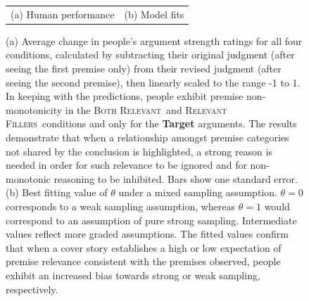 \documentclass[doc,12pt]{apa}
\newcommand{\relevant}{\textsc{Both Relevant}}
\newcommand{\relevantdata}{\textsc{Relevant Fillers}}
\begin{document}
\begin{figure}[htbp]
\begin{center}
\begin{tabular}{cc}
\multicolumn{1}{c}{\small (a) Human performance} &
\multicolumn{1}{c}{\small (b) Model fits}
\end{tabular}
\end{center}
\vspace{-5mm}
\caption{%
   (a) Average change in people's argument strength ratings for all four conditions, calculated by subtracting their original judgment (after seeing the first premise only) from their revised judgment (after seeing the second premise), then linearly scaled to the range -1 to 1.
%
In keeping with the predictions, people exhibit premise non-monotonicity in the \relevant\ and \relevantdata\ conditions and only for the {\bf Target} arguments. The results demonstrate that when a relationship amongst premise categories not shared by the conclusion is highlighted, a strong reason is needed in order for such relevance to be ignored and for non-monotonic reasoning to be inhibited. Bars show one standard error.\ %
%
  (b) Best fitting value of $\theta$ under a mixed sampling assumption. $\theta=0$ corresponds to a weak sampling assumption, whereas $\theta=1$ would correspond to an assumption of pure strong sampling. Intermediate values reflect more graded assumptions. The fitted values confirm that when a cover story establishes a high or low expectation of premise relevance consistent with the premises observed, people exhibit an increased bias towards strong or weak sampling, respectively.\ %
}
\label{fig:results}
\end{figure}
\end{document}
